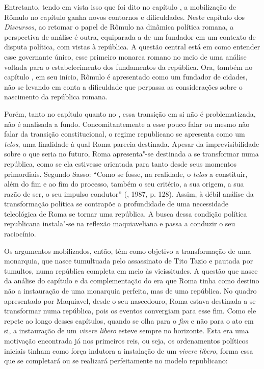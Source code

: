 Entretanto, tendo em vista isso que foi dito no capítulo , a
mobilização de Rômulo no capítulo  ganha novos contornos e
dificuldades. Neste capítulo dos \emph{Discursos}, ao retomar o papel de
Rômulo na dinâmica política romana, a perspectiva de análise é outra,
equiparada a de um fundador em um contexto de disputa política, com
vistas à república. A questão central está em como entender esse
governante único, esse primeiro monarca romano no meio de uma análise
voltada para o estabelecimento dos fundamentos da república. Ora, também
no capítulo , em seu início, Rômulo é apresentado como um fundador de
cidades, não se levando em conta a dificuldade que perpassa as
considerações sobre o nascimento da república romana.

Porém, tanto no capítulo  quanto no , essa transição em si não é
problematizada, não é analisada a fundo. Concomitantemente a esse pouco
falar ou mesmo não falar da transição constitucional, o regime
republicano se apresenta como um \emph{telos}, uma finalidade à qual
Roma parecia destinada. Apesar da imprevisibilidade sobre o que seria no
futuro, Roma apresenta"-se destinada a se transformar numa república,
como se ela estivesse orientada para tanto desde seus momentos
primordiais. Segundo Sasso: ``Como se fosse, na realidade, o
\emph{telos} a constituir, além do fim e ao fim do processo, também o
seu critério, a sua origem, a sua razão de ser, o seu impulso condutor''
(, 1987, p. 128). Assim, à débil análise da transformação
política se contrapõe a profundidade de uma necessidade teleológica de
Roma se tornar uma república. A busca dessa condição política
republicana instala"-se na reflexão maquiaveliana e passa a conduzir o
seu raciocínio.

Os argumentos mobilizados, então, têm como objetivo a transformação de
uma monarquia, que nasce tumultuada pelo assassinato de Tito Tazio e
pautada por tumultos, numa república completa em meio às vicissitudes. A
questão que nasce da análise do capítulo  e da complementação do 
era que Roma tinha como destino não a instauração de uma monarquia
perfeita, mas de uma república. No quadro apresentado por Maquiavel,
desde o seu nascedouro, Roma estava destinada a se transformar numa
república, pois os eventos convergiam para esse fim. Como ele repete ao
longo desses capítulos, quando se olha para o \emph{fim} e não para o
ato em si, a instauração de um \emph{vivere libero} esteve sempre no
horizonte. Esta era uma motivação encontrada já nos primeiros reis, ou
seja, os ordenamentos políticos iniciais tinham como força indutora a
instalação de um \emph{vivere libero}, forma essa que se completará ou
se realizará perfeitamente no modelo republicano:

